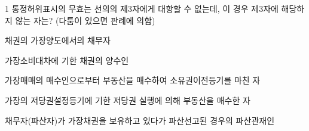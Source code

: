 \begin{question}{1}
통정허위표시의 무효는 선의의 제3자에게 대항할 수 없는데, 이 경우 제3자에 해당하지 않는 자는? (다툼이 있으면 판례에 의함)
\begin{choices}
  \item 채권의 가장양도에서의 채무자
  \item 가장소비대차에 기한 채권의 양수인
  \item 가장매매의 매수인으로부터 부동산을 매수하여 소유권이전등기를 마친 자
  \item 가장의 저당권설정등기에 기한 저당권 실행에 의해 부동산을 매수한 자
  \item 채무자(파산자)가 가장채권을 보유하고 있다가 파산선고된 경우의 파산관재인
\end{choices}
\end{question}
